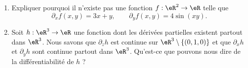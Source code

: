 \begin{exercice}\label{exoGeomAnal-0017}

  \begin{enumerate}
 
  \item Expliquer pourquoi il n'existe pas une fonction $f: \eR^2\to \eR $ telle que 
    \begin{equation}
      \partial_x f(x,y)= 3x+y, \qquad \partial_y f(x,y)= 4\sin(xy).
    \end{equation}
    \item Soit  $h: \eR^3\to \eR $ une fonction dont les dérivées partielles existent partout dans $\eR^3$. Nous savons que $\partial_z h$ est continue sur  $\eR^3\setminus \{(0,1,0)\}$ et que $\partial_x h$ et $\partial_y h$ sont continue partout dans $\eR^3$. Qu'est-ce que pouvons nous dire de la différentiabilité de $h$ ? 
  \end{enumerate}

\end{exercice}
